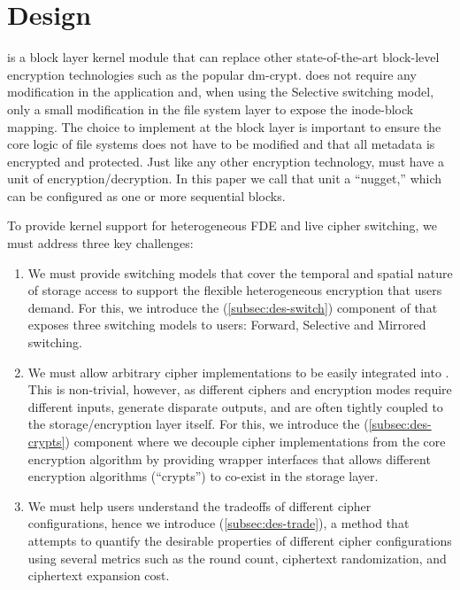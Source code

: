 \section{\sys Design}\label{sec:des}

\sys is a block layer kernel module that can replace other state-of-the-art
block-level encryption technologies such as the popular dm-crypt. \sys does not
require any modification in the application and, when using the Selective
switching model, only a small modification in the file system layer to expose
the inode-block mapping. The choice to implement \sys at the block layer is
important to ensure the core logic of file systems does not have to be modified
and that all metadata is encrypted and protected. Just like any other encryption
technology, \sys must have a unit of encryption/decryption. In this paper we
call that unit a ``nugget,'' which can be configured as one or more sequential
blocks.

To provide kernel support for heterogeneous FDE and live cipher switching, we
must address three key challenges:

\begin{enumerate}

\item We must provide switching models that cover the temporal and spatial
  nature of storage access to support the flexible heterogeneous encryption that
  users demand. For this, we introduce the \sysA (\cref{subsec:des-switch})
  component of \sys that exposes three switching models to users: Forward,
  Selective and Mirrored switching.

\item We must allow arbitrary cipher implementations to be easily integrated
  into \sys. This is non-trivial, however, as different ciphers and encryption
  modes require different inputs, generate disparate outputs, and are often
  tightly coupled to the storage/encryption layer itself. For this, we introduce
  the \sysB (\cref{subsec:des-crypts}) component where we decouple cipher
  implementations from the core encryption algorithm by providing wrapper
  interfaces that allows different encryption algorithms (``crypts'') to
  co-exist in the storage layer.

\item We must help users understand the tradeoffs of different cipher
  configurations, hence we introduce \sysC (\cref{subsec:des-trade}), a method
  that attempts to quantify the desirable properties of different cipher
  configurations using several metrics such as the round count, ciphertext
  randomization, and ciphertext expansion cost.

\end{enumerate}

